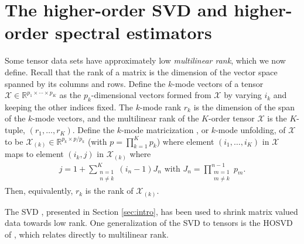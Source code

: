 \section{The higher-order SVD and higher-order spectral estimators}
\label{sec:tensor}

Some tensor data sets have approximately low \emph{multilinear rank},
which we now define. Recall that the rank of a matrix is the dimension
of the vector space spanned by its columns and rows. Define the
$k$-mode vectors of a tensor $\mathcal{X} \in
\mathbb{R}^{p_1\times\cdots\times p_K}$ as the $p_k$-dimensional
vectors formed from $\mathcal{X}$ by varying $i_k$ and keeping the
other indices fixed. The $k$-mode rank $r_k$ is the dimension of the
span of the $k$-mode vectors, and the multilinear rank of the
$K$-order tensor $\mathcal{X}$ is the $K$-tuple,
$(r_1,\ldots,r_K)$. Define the $k$-mode matricization
\citep{kolda2009tensor}, or $k$-mode unfolding, of $\mathcal{X}$ to be
$\mathcal{X}_{(k)}\in \mathbb{R}^{p_k \times p/p_k}$ (with $p =
\prod_{k=1}^Kp_k$) where element $(i_1,\ldots,i_K)$ in $\mathcal{X}$
maps to element $(i_k,j)$ in $\mathcal{X}_{(k)}$ where
\begin{align*}
  j = 1 + \sum_{\substack{n = 1 \\ n\neq k}}^{K}(i_n - 1)J_n \text{ with } J_n = \prod_{\substack{ m = 1 \\ m \neq k}}^{n-1}p_m.
\end{align*}
Then, equivalently, $r_k$ is the rank of $\mathcal{X}_{(k)}$.

The SVD , presented in Section \ref{sec:intro}, has been used to
shrink matrix valued data towards low rank. One generalization of the
SVD to tensors is the HOSVD of \cite{de2000multilinear}, which relates
directly to multilinear rank.

